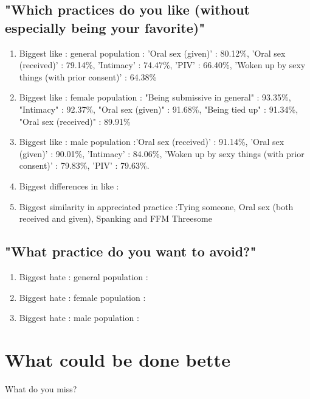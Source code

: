 \documentclass[10pt,a4paper]{article}
\begin{document}
\subsection{"Which practices do you like (without especially being your favorite)"}
\begin{enumerate}
\item{Biggest like : general population : 'Oral sex (given)' : 80.12\%, 'Oral sex (received)' : 79.14\%, 'Intimacy' : 74.47\%, 'PIV' : 66.40\%, 'Woken up by sexy things (with prior consent)' : 64.38\%} 

\item{Biggest like : female population : "Being submissive in general" : 93.35\%, "Intimacy" : 92.37\%, "Oral sex (given)" : 91.68\%, "Being tied up" : 91.34\%, "Oral sex (received)" : 89.91\%}

\item{Biggest like : male population :'Oral sex (received)' : 91.14\%, 'Oral sex (given)' : 90.01\%, 'Intimacy' : 84.06\%, 'Woken up by sexy things (with prior consent)' : 79.83\%, 'PIV' : 79.63\%}.

\item{Biggest differences in like :} 

\item{Biggest similarity in appreciated  practice :Tying someone, Oral sex (both received and given), Spanking and FFM Threesome} 
\end{enumerate}

\subsection{"What practice do you want to avoid?"}
\begin{enumerate}
\item{Biggest hate : general population :} 
\item{Biggest hate : female population :} 
\item{Biggest hate : male population :} 


\end{enumerate}
\section{What could be done bette}
What do you miss?
\end{document}
